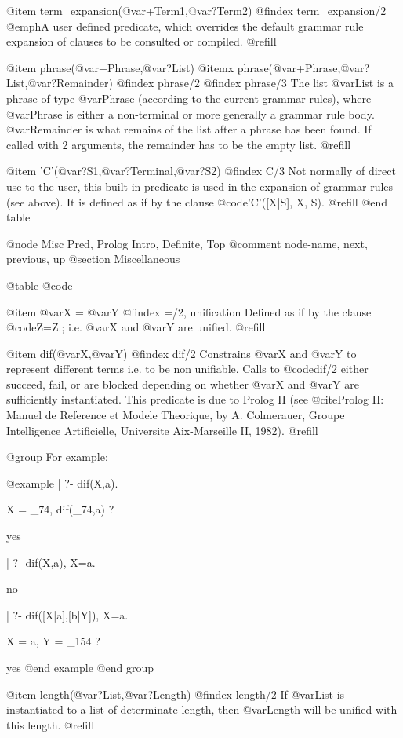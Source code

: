 @item term_expansion(@var{+Term1},@var{?Term2})
@findex term_expansion/2
@emph{A user defined predicate}, which overrides the default grammar
rule expansion of clauses to be consulted or compiled. @refill

@item phrase(@var{+Phrase},@var{?List})
@itemx phrase(@var{+Phrase},@var{?List},@var{?Remainder})
@findex phrase/2
@findex phrase/3
The list @var{List} is a phrase of type @var{Phrase} (according to the
current grammar rules), where @var{Phrase} is either a non-terminal or more
generally a grammar rule body. @var{Remainder} is what remains of the list
after a phrase has been found.  If called with 2 arguments, the remainder has
to be the empty list. @refill

@item 'C'(@var{?S1},@var{?Terminal},@var{?S2})
@findex C/3
Not normally of direct use to the user, this built-in predicate is used in
the expansion of grammar rules (see above).  It is defined as if by the
clause @code{'C'([X|S], X, S).} @refill
@end table

@node Misc Pred, Prolog Intro, Definite, Top
@comment  node-name,  next,  previous,  up
@section Miscellaneous

@table @code

@item @var{X} = @var{Y}
@findex =/2, unification
Defined as if by the clause @code{Z=Z.}; i.e. @var{X} and @var{Y} are
unified. @refill

@item dif(@var{X},@var{Y})
@findex dif/2
Constrains @var{X} and @var{Y} to represent different terms i.e. to be
non unifiable.  Calls to @code{dif/2} either succeed, fail, or are
blocked depending on whether @var{X} and @var{Y} are sufficiently
instantiated.  This predicate is due to Prolog II (see @cite{Prolog II:
Manuel de Reference et Modele Theorique}, by A. Colmerauer, Groupe
Intelligence Artificielle, Universite Aix-Marseille II, 1982). @refill

@group
For example:

@example
| ?- dif(X,a).

X = _74,
dif(_74,a) ?

yes

| ?- dif(X,a), X=a.

no

| ?- dif([X|a],[b|Y]), X=a.

X = a,
Y = _154 ?

yes
@end example
@end group

@item length(@var{?List},@var{?Length})
@findex length/2
If @var{List} is instantiated to a list of determinate length, then
@var{Length} will be unified with this length. @refill

